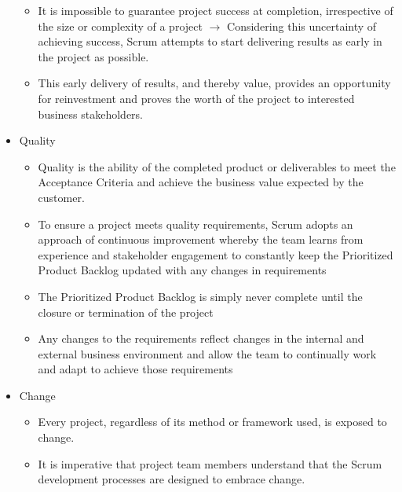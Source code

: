 \documentclass[letterpaper,10pt,english]{jupyterBook}
\begin{document}
\begin{itemize}
\begin{itemize}
\item {} 
\sphinxAtStartPar
It is impossible to guarantee project success at completion, irrespective of the size or complexity of a project \(\rightarrow\) Considering this uncertainty of achieving success, Scrum attempts to start delivering results as early in the project as possible.

\item {} 
\sphinxAtStartPar
This early delivery of results, and thereby value, provides an opportunity for reinvestment and proves the worth of the project to interested business stakeholders.

\end{itemize}

\item {} 
\sphinxAtStartPar
Quality
\begin{itemize}
\item {} 
\sphinxAtStartPar
Quality is the ability of the completed product or deliverables to meet the Acceptance Criteria and achieve the business value expected by the customer.

\item {} 
\sphinxAtStartPar
To ensure a project meets quality requirements, Scrum adopts an approach of continuous improvement whereby
the team learns from experience and stakeholder engagement to constantly keep the Prioritized Product Backlog
updated with any changes in requirements

\item {} 
\sphinxAtStartPar
The Prioritized Product Backlog is simply never complete until the closure or termination of the project

\item {} 
\sphinxAtStartPar
Any changes to the requirements reflect changes in the internal and external business environment and allow the team to continually work and adapt to achieve those requirements

\end{itemize}

\item {} 
\sphinxAtStartPar
Change
\begin{itemize}
\item {} 
\sphinxAtStartPar
Every project, regardless of its method or framework used, is exposed to change.

\item {} 
\sphinxAtStartPar
It is imperative that project team members understand that the Scrum development processes are designed to embrace change.


\end{itemize}
\end{itemize}
\end{document}
